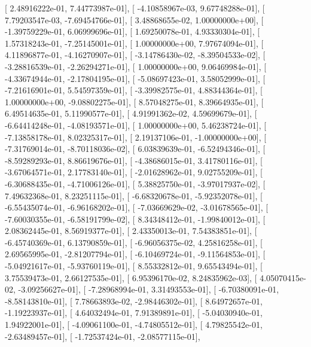 \documentclass{article}
\begin{document}
       [  2.48916222e-01,   7.44773987e-01],
       [ -4.10858967e-03,   9.67748288e-01],
       [  7.79203547e-03,  -7.69454766e-01],
       [  3.48868655e-02,   1.00000000e+00],
       [ -1.39759229e-01,   6.06999696e-01],
       [  1.69250078e-01,   4.93330304e-01],
       [  1.57318243e-01,  -7.25145001e-01],
       [  1.00000000e+00,   7.97674094e-01],
       [  4.11896877e-01,  -4.16270907e-01],
       [ -3.14786430e-02,  -8.39504533e-02],
       [ -3.28816539e-01,  -2.26294271e-01],
       [  1.00000000e+00,   9.06469984e-01],
       [ -4.33674944e-01,  -2.17804195e-01],
       [ -5.08697423e-01,   3.58052999e-01],
       [ -7.21616901e-01,   5.54597359e-01],
       [ -3.39982575e-01,   4.88344364e-01],
       [  1.00000000e+00,  -9.08802275e-01],
       [  8.57048275e-01,   8.39664935e-01],
       [  6.49514635e-01,   5.11990577e-01],
       [  4.91991362e-02,   4.59699679e-01],
       [ -6.64414248e-01,  -4.08193571e-01],
       [  1.00000000e+00,   5.46238724e-01],
       [ -7.13858178e-01,   8.02325317e-01],
       [  2.19137106e-01,  -1.00000000e+00],
       [ -7.31769014e-01,  -8.70118036e-02],
       [  6.03839639e-01,  -6.52494346e-01],
       [ -8.59289293e-01,   8.86619676e-01],
       [ -4.38686015e-01,   3.41780116e-01],
       [ -3.67064571e-01,   2.17783140e-01],
       [ -2.01628962e-01,   9.02755209e-01],
       [ -6.30688435e-01,  -4.71006126e-01],
       [  5.38825750e-01,  -3.97017937e-02],
       [  7.49632368e-01,   8.23251115e-01],
       [ -6.68320678e-01,  -5.92352078e-01],
       [ -6.55435074e-01,  -6.96168202e-01],
       [ -7.03669629e-02,  -3.01678565e-01],
       [ -7.60030355e-01,  -6.58191799e-02],
       [  8.34348412e-01,  -1.99840012e-01],
       [  2.08362445e-01,   8.56919377e-01],
       [  2.43350013e-01,   7.54383851e-01],
       [ -6.45740369e-01,   6.13790859e-01],
       [ -6.96056375e-02,   4.25816258e-01],
       [  2.69565995e-01,  -2.81207794e-01],
       [ -6.10469724e-01,  -9.11564853e-01],
       [ -5.04921617e-01,  -5.93760119e-01],
       [  8.55332812e-01,   9.65543494e-01],
       [  3.75539473e-01,   2.66127535e-01],
       [  6.95396170e-02,   8.24835962e-03],
       [  4.05070415e-02,  -3.09256627e-01],
       [ -7.28968994e-01,   3.31493553e-01],
       [ -6.70380091e-01,  -8.58143810e-01],
       [  7.78663893e-02,  -2.98446302e-01],
       [  8.64972657e-01,  -1.19223937e-01],
       [  4.64032494e-01,   7.91389891e-01],
       [ -5.04030940e-01,   1.94922001e-01],
       [ -4.09061100e-01,  -4.74805512e-01],
       [  4.79825542e-01,  -2.63489457e-01],
       [ -1.72537424e-01,  -2.08577115e-01],
\end{document}
